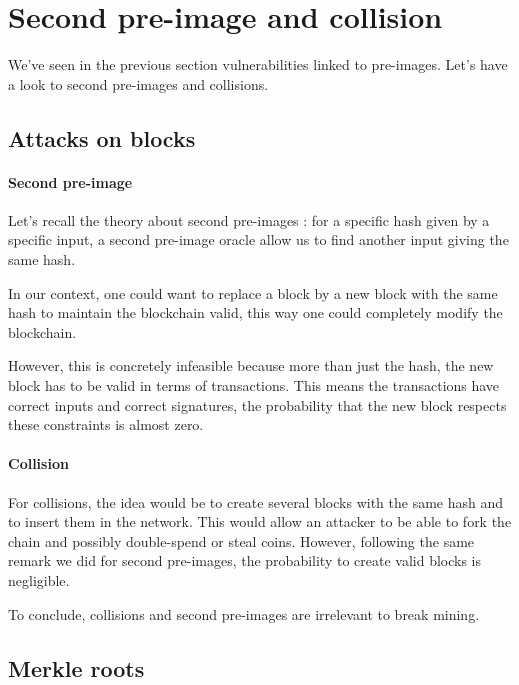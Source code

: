 \section{Second pre-image and collision}

We've seen in the previous section vulnerabilities linked to pre-images. Let's have a look to second pre-images and collisions.

  \subsection{Attacks on blocks}

    \paragraph{Second pre-image}

Let's recall the theory about second pre-images : for a specific hash given by a specific input, a second pre-image oracle allow us to find another input giving the same hash.

In our context, one could want to replace a block by a new block with the same hash to maintain the blockchain valid, this way one could completely modify the blockchain.

However, this is concretely infeasible because more than just the hash, the new block has to be valid in terms of transactions. This means the transactions have correct inputs and correct signatures, the probability that the new block respects these constraints is almost zero. \newline

    \paragraph{Collision}

For collisions, the idea would be to create several blocks with the same hash and to insert them in the network. This would allow an attacker to be able to fork the chain and possibly double-spend or steal coins.
However, following the same remark we did for second pre-images, the probability to create valid blocks is negligible. \newline

To conclude, collisions and second pre-images are irrelevant to break mining.

  \subsection{Merkle roots}


